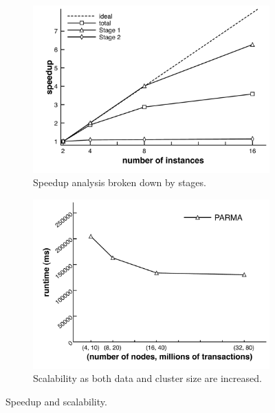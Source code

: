 \begin{figure}[thb]
  \centering
  \begin{subfigure}[b]{0.49\textwidth}
    \centering
    \includegraphics[width=\textwidth]{parma/speedup}
    \caption{Speedup analysis broken down by stages.}
    \label{fig:parmaspeedup}
  \end{subfigure}
  \hfill
  \begin{subfigure}[b]{0.49\textwidth}
    \centering
    \includegraphics[width=\textwidth]{parma/scalability}
    \caption{Scalability as both data and cluster size are increased.}
    \label{fig:parmascalability}
  \end{subfigure}
  \caption{Speedup and scalability.}
\end{figure}

